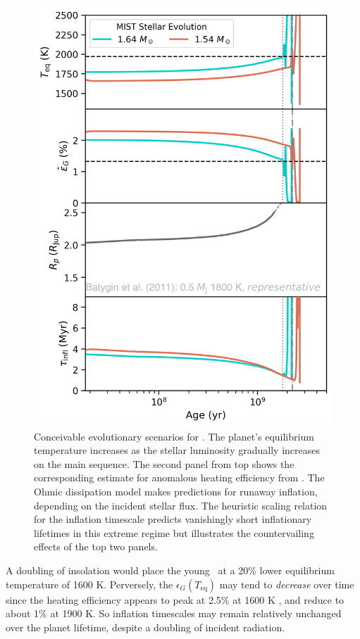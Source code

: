 \documentclass[twocolumn]{aastex631}
\newcommand{\hatpb}{\object{HAT-P-67 b}}
\begin{document}
\begin{figure}
    \includegraphics[width=\linewidth]{figures/reinflation_MIST.png}
    \caption{Conceivable evolutionary scenarios for \hatpb.  The planet's equilibrium temperature increases as the stellar luminosity gradually increases on the main sequence.  The second panel from top shows the corresponding estimate for anomalous heating efficiency from \citet{2018AJ....155..214T}. The Ohmic dissipation model makes predictions for runaway inflation, depending on the incident stellar flux.  The heuristic scaling relation for the inflation timescale predicts vanishingly short inflationary lifetimes in this extreme regime but illustrates the countervailing effects of the top two panels.}
    \label{fig:OhmicInflate}
\end{figure}

A doubling of insolation would place the young \hatpb~at a 20\% lower equilibrium temperature of 1600 K.  Perversely, the $\epsilon_G(T_\mathrm{eq})$ may tend to \emph{decrease} over time since the heating efficiency appears to peak at 2.5\% at 1600 K \citep{2018AJ....155..214T}, and reduce to about 1\% at 1900 K.  So inflation timescales may remain relatively unchanged over the planet lifetime, despite a doubling of incident radiation.
\end{document}
